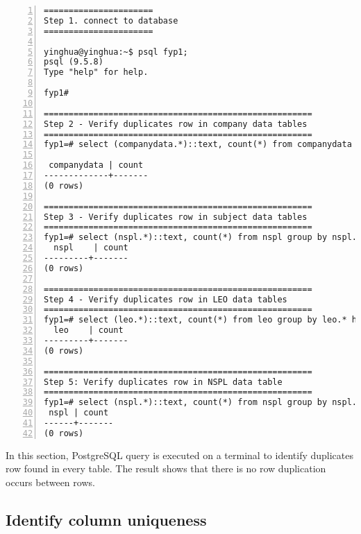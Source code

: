 \lstset{basicstyle=\ttfamily\tiny} 
\begin{lstlisting}[breaklines, frame=single, numbers=left, caption={Identify row uniqueness}, label=commandline-02]
======================
Step 1. connect to database
======================

yinghua@yinghua:~$ psql fyp1;
psql (9.5.8)
Type "help" for help.

fyp1#

======================================================
Step 2 - Verify duplicates row in company data tables
======================================================
fyp1=# select (companydata.*)::text, count(*) from companydata group by companydata.* having count(*) > 1;

 companydata | count 
-------------+-------
(0 rows)

======================================================
Step 3 - Verify duplicates row in subject data tables
======================================================
fyp1=# select (nspl.*)::text, count(*) from nspl group by nspl.* having count(*) > 1; 
  nspl    | count 
---------+-------
(0 rows)

======================================================
Step 4 - Verify duplicates row in LEO data tables
======================================================
fyp1=# select (leo.*)::text, count(*) from leo group by leo.* having count(*) > 1; 
  leo    | count 
---------+-------
(0 rows)

======================================================
Step 5: Verify duplicates row in NSPL data table
======================================================
fyp1=# select (nspl.*)::text, count(*) from nspl group by nspl.* having count(*) > 1;
 nspl | count 
------+-------
(0 rows)

\end{lstlisting}

In this section, PostgreSQL query is executed on a terminal to identify duplicates row found in every table. The result shows that there is no row duplication occurs between rows. 

\subsection{Identify column uniqueness}

